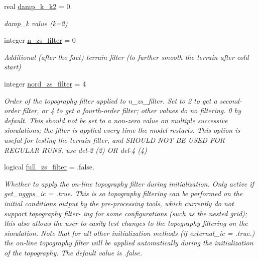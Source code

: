 \begin{DoxyCompactItemize}
real \hyperlink{structfv__arrays__mod_1_1fv__flags__type_ad632b60850fd35d3d6a63123d8535802}{damp\-\_\-k\-\_\-k2} = 0.
\begin{DoxyCompactList}\small\item\em damp\-\_\-k value (k=2) \end{DoxyCompactList}\item 
integer \hyperlink{structfv__arrays__mod_1_1fv__flags__type_a068897c1792b9952e1fd5ee9f96d4400}{n\-\_\-zs\-\_\-filter} = 0
\begin{DoxyCompactList}\small\item\em Additional (after the fact) terrain filter (to further smooth the terrain after cold start) \end{DoxyCompactList}\item 
integer \hyperlink{structfv__arrays__mod_1_1fv__flags__type_a98601ce30b19c5c1c911dc216d3fc22a}{nord\-\_\-zs\-\_\-filter} = 4
\begin{DoxyCompactList}\small\item\em Order of the topography filter applied to n\-\_\-zs\-\_\-filter. Set to 2 to get a second-\/order filter, or 4 to get a fourth-\/order filter; other values do no filtering. 0 by default. This should not be set to a non-\/zero value on multiple successive simulations; the filter is applied every time the model restarts. This option is useful for testing the terrain filter, and S\-H\-O\-U\-L\-D N\-O\-T B\-E U\-S\-E\-D F\-O\-R R\-E\-G\-U\-L\-A\-R R\-U\-N\-S. use del-\/2 (2) O\-R del-\/4 (4) \end{DoxyCompactList}\item 
logical \hyperlink{structfv__arrays__mod_1_1fv__flags__type_afbe4a46c5b9ecf80644125620d3bf57d}{full\-\_\-zs\-\_\-filter} = .false.
\begin{DoxyCompactList}\small\item\em Whether to apply the on-\/line topography filter during initialization. Only active if get\-\_\-nggps\-\_\-ic = .true. This is so topography filtering can be performed on the initial conditions output by the pre-\/processing tools, which currently do not support topography filter-\/ ing for some configurations (such as the nested grid); this also allows the user to easily test changes to the topography filtering on the simulation. Note that for all other initialization methods (if external\-\_\-ic = .true.) the on-\/line topography filter will be applied automatically during the initialization of the topography. The default value is .false. \end{DoxyCompactList}\item 

\end{DoxyCompactItemize}
